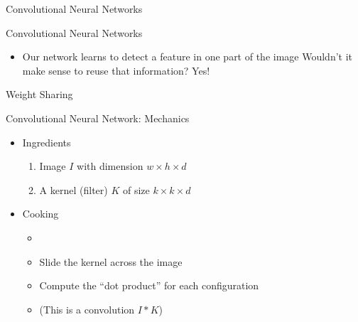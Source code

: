 \begin{slide}{Convolutional Neural Networks}
\end{slide}


\begin{slide}{Convolutional Neural Networks}
  \begin{itemize}
    \item Our network learns to detect a feature in one part of the image
    \pitem Wouldn't it make sense to reuse that information?
    \pitem Yes!
  \end{itemize}
  \vspace{0.5cm}
  {
    \Large
    Weight Sharing
  }
\end{slide}

\begin{slide}{Convolutional Neural Network: Mechanics}
  \begin{itemize}
    \item<2-> Ingredients
    \begin{enumerate}
      \item<3-> Image $I$ with dimension $w \times h \times d$
      \item<4-> A kernel (filter) $K$ of size $k \times k \times d$
    \end{enumerate}
    \item<5-> Cooking
    \begin{itemize}
      \item<6-> 
      \item<8-> Slide the kernel across the image
      \item<9-> Compute the ``dot product'' for each configuration
      \item<10-> (This is a convolution $I \ast K$)
    \end{itemize}
  \end{itemize}
\end{slide}


